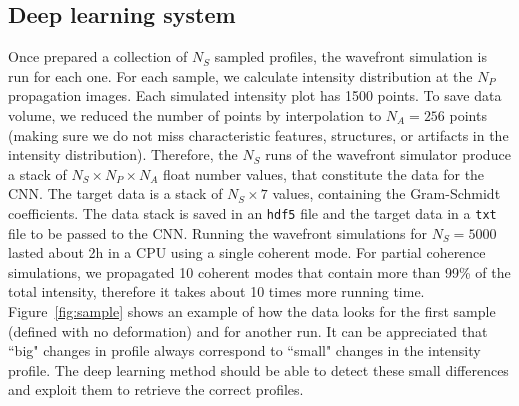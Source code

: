 \documentclass[preprint]{iucr}
\newcommand{\inred}[1]{{\color{red}#1}}
\begin{document}
\subsection{Deep learning system}
Once prepared a collection of $N_S$ sampled profiles, the wavefront simulation is run for each one. For each sample,  we calculate intensity distribution at the $N_P$ propagation images. Each simulated intensity plot has 1500 points. To save data volume, we reduced the number of points by interpolation to $N_A=256$ points (making sure we do not miss characteristic features, structures, or artifacts in the intensity distribution). Therefore, the $N_S$ runs of the wavefront simulator produce a stack of $N_S \times N_P \times N_A$ float number values, that constitute the data for the CNN. The target data is a stack of $N_S \times 7$ values, containing the Gram-Schmidt coefficients. The data stack is saved in an \texttt{hdf5} file and the target data in a \texttt{txt} file to be passed to the CNN. Running the wavefront simulations for $N_S=5000$ lasted about 2h in a CPU using a single coherent mode. For partial coherence simulations, we propagated 10 coherent modes that contain more than 99\% of the total intensity, therefore it takes about 10 times more running time. Figure~\ref{fig:sample} shows an example of how the data looks for the first sample (defined with no deformation) and for another run. \inred{It can be appreciated that ``big" changes in profile always correspond to ``small" changes in the intensity profile. The deep learning method should be able to detect these small differences and exploit them to retrieve the correct profiles. }
\end{document}
